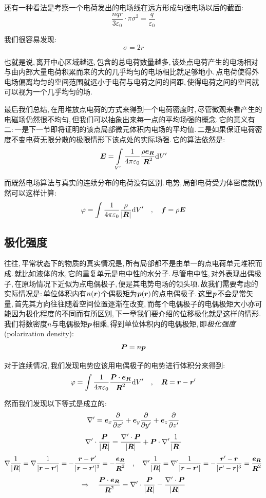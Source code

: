 还有一种看法是考察一个电荷发出的电场线在远方形成匀强电场以后的截面:
\[\frac{nqr}{3\varepsilon_0}\cdot \pi\sigma^2=\frac{q}{\varepsilon_0}\]

我们很容易发现:
\[\sigma=2r\]

也就是说,\,离开中心区域越远,\,包含的总电荷数量越多,\,该处点电荷产生的电场相对与由内部大量电荷积累而来的大的几乎均匀的电场相比就足够地小.\,点电荷使得外电场偏离均匀的空间范围就远小于电荷与电荷之间的间距,\,使得电荷之间的空间就可以视为一个几乎均匀的场.

最后我们总结,\,在用堆放点电荷的方式来得到一个电荷密度时,\,尽管微观来看产生的电磁场仍然很不均匀,\,但我们可以抽象出来每一点的平均场强的概念.\,它的意义有二:\,一是下一节即将证明的该点局部微元体积内电场的平均值.\,二是如果保证电荷密度不变电荷无限分散的极限情形下该点处的实际场强.\,它的算法依然是:
\[\boldsymbol{E}=\int\limits_{V'} \frac{1}{4\pi\varepsilon_0} \frac{\rho \boldsymbol{e}_{\boldsymbol{R}}}{\boldsymbol{R}^2} \textrm{d} V'\]

而既然电场算法与真实的连续分布的电荷没有区别.\,电势,\,局部电荷受力体密度就仍然可以这样计算:
\[\varphi=\int \frac{1}{4\pi\varepsilon_0}\frac{\rho}{|\boldsymbol{R}|}\textrm{d} V'\quad ,\quad \boldsymbol{f}=\rho \boldsymbol{E}\]

\subsection{极化强度}

往往,\,平常状态下的物质的真实情况是,\,所有局部都不是由单一的点电荷单元堆积而成.\,就比如液体的水,\,它的重复单元是电中性的水分子.\,尽管电中性,\,对外表现出偶极子,\,在原场情况下近似为点电偶极子,\,便是其电势电场的领头项.\,故我们需要考虑的实际情况是:\,单位体积内有$n(\boldsymbol{r})$个偶极矩为$\boldsymbol{p}(\boldsymbol{r})$的点电偶极子.\,这里$\boldsymbol{p}$不会是常矢量,\,首先其方向往往随着空间位置逐渐在改变,\,而每个电偶极子的电偶极矩大小亦可能因为极化程度的不同而有所区别,\,下一章我们要介绍的位移极化就是这样的情形.\,我们将数密度$n$与电偶极矩$\boldsymbol{p}$相乘,\,得到单位体积内的电偶极矩,\,即\emph{极化强度}(polarization density):
\[\boldsymbol{P}=n\boldsymbol{p}\]

对于连续情况,\,我们发现电势应该用电偶极子的电势进行体积分来得到:
\[\varphi=\int \frac{1}{4\pi\varepsilon_0} \frac{\boldsymbol{P}\cdot \boldsymbol{e}_{\boldsymbol{R}}}{\boldsymbol{R}^2}\textrm{d} V' \quad ,\quad \boldsymbol{R}=\boldsymbol{r}-\boldsymbol{r}'\]

然而我们发现以下等式是成立的:
\[\nabla'=\boldsymbol{e}_x\frac{\partial}{\partial x'}+\boldsymbol{e}_y\frac{\partial}{\partial y'}+\boldsymbol{e}_z\frac{\partial}{\partial z'}\]
\[\nabla'\cdot\frac{\boldsymbol{P}}{|\boldsymbol{R}|}=\frac{\nabla'\cdot \boldsymbol{P}}{|\boldsymbol{R}|}+\boldsymbol{P}\cdot\nabla'\frac{1}{|\boldsymbol{R}|}\]
\[\nabla\frac{1}{|\boldsymbol{R}|}=\nabla\frac{1}{|\boldsymbol{r}-\boldsymbol{r}'|}=-\frac{\boldsymbol{r}-\boldsymbol{r}'}{|\boldsymbol{r}-\boldsymbol{r}'|^3}=-\frac{\boldsymbol{e}_{\boldsymbol{R}}}{\boldsymbol{R}^2}\quad,\quad \nabla'\frac{1}{|\boldsymbol{R}|}=\nabla'\frac{1}{|\boldsymbol{r}-\boldsymbol{r}'|}=-\frac{\boldsymbol{r}'-\boldsymbol{r}}{|\boldsymbol{r}'-\boldsymbol{r}|^3}=\frac{\boldsymbol{e}_{\boldsymbol{R}}}{\boldsymbol{R}^2}\]
\[\Rightarrow\quad \frac{\boldsymbol{P}\cdot \boldsymbol{e}_{\boldsymbol{R}}}{\boldsymbol{R}^2}=\nabla'\cdot\frac{\boldsymbol{P}}{|\boldsymbol{R}|}-\frac{\nabla'\cdot \boldsymbol{P}}{|\boldsymbol{R}|}\]

